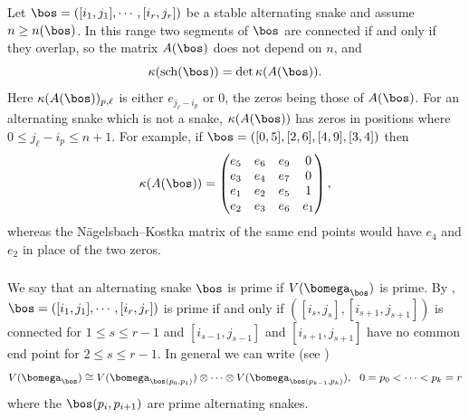 \documentclass[11pt,reqno]{amsart}
\theoremstyle{definition} \newtheorem*{defn}{Definition}
\theoremstyle{definition}
\numberwithin{equation}{section}
\begin{document}
\subsubsection{} Let $\bos=([i_1,j_1],\cdots,[i_r,j_r])$ be a stable alternating snake and assume $n\ge n(\bos)$. In
this range two segments of $\bos$ are connected if and only if they overlap, so the matrix $A(\bos)$ does not depend on $n$, and
$$\kappa({\rm sch}(\bos))=\det\kappa(A(\bos)).$$
Here $\kappa(A(\bos))_{p,\ell}$ is either $e_{j_\ell-i_p}$ or $0$, the zeros being those of $A(\bos)$. For an alternating snake which is not a snake,
$\kappa(A(\bos))$ has zeros in positions where $0\le j_\ell-i_p\le n+1$. For example,
if $\bos=([0,5],[2,6],[4,9],[3,4])$ then
$$\kappa(A(\bos))=\begin{pmatrix}e_5&e_6&e_9&0\\ e_3&e_4&e_7&0\\ e_1&e_2&e_5&1\\ e_2&e_3&e_6&e_1\end{pmatrix},$$
whereas the N\"agelsbach--Kostka matrix of the same end points would have $e_4$ and $e_2$ in place of the two zeros.

\subsubsection{} We say that an alternating snake $\bos$ is prime if $V(\bomega_\bos)$ is prime. By
\cite[Theorem 1]{BC25a}, $\bos=([i_1,j_1],\cdots,[i_r,j_r])$ is prime if and only if $([i_s,j_s],[i_{s+1},j_{s+1}])$ is connected for $1\le s\le r-1$
and $[i_{s-1},j_{s-1}]$ and $[i_{s+1},j_{s+1}]$ have no common end point for $2\le s\le r-1$. In general we can write (see \cite[Theorem 1]{BC25a})
$$V(\bomega_\bos)\cong V(\bomega_{\bos(p_0,p_1)})\otimes\cdots\otimes V(\bomega_{\bos(p_{k-1},p_k)}),\ \ 0=p_0<\cdots<p_k=r$$ where the $\bos(p_i,p_{i+1})$ are prime alternating snakes.
\end{document}
